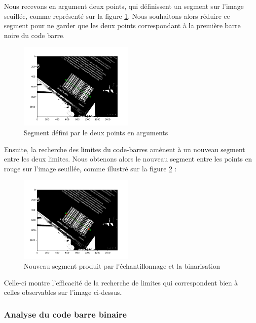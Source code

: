 \documentclass{rapport}
\begin{document}
Nous recevons en argument deux points, qui définissent un segment sur l'image seuillée, comme représenté sur la figure \ref{fig:segment}.
Nous souhaitons alors réduire ce segment pour ne garder que les deux points correspondant à la première barre noire du code barre.

\begin{figure}[H] 
	\centering
	\includegraphics[width=0.5\textwidth]{images/code_barre_couple_vert.png}
	\caption{Segment défini par le deux points en arguments}
	\label{fig:segment}
\end{figure}

Ensuite, la recherche des limites du code-barres amènent à un nouveau segment entre les deux limites. 
Nous obtenons alors le nouveau segment entre les points en rouge sur l'image seuillée, comme illustré sur la figure \ref{fig:binarisation} : 

\begin{figure}[H] 
	\centering
	\includegraphics[width=0.5\textwidth]{images/binarisation.png}
	\caption{Nouveau segment produit par l'échantillonnage et la binarisation}
	\label{fig:binarisation}
\end{figure}

Celle-ci montre l'efficacité de la recherche de limites qui correspondent bien à celles observables sur l'image ci-dessus.

\subsubsection*{Analyse du code barre binaire}
\end{document}
